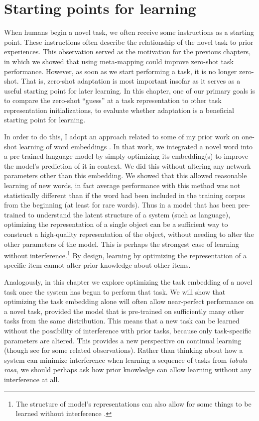 \section{Starting points for learning}

When humans begin a novel task, we often receive some instructions as a starting point. These instructions often describe the relationship of the novel task to prior experiences. This observation served as the motivation for the previous chapters, in which we showed that using meta-mapping could improve zero-shot task performance. However, as soon as we start performing a task, it is no longer zero-shot. That is, zero-shot adaptation is most important insofar as it serves as a useful starting point for later learning. In this chapter, one of our primary goals is to compare the zero-shot ``guess'' at a task representation to other task representation initializations, to evaluate whether adaptation is a beneficial starting point for learning. \par 
In order to do this, I adopt an approach related to some of my prior work on one-shot learning of word embeddings \citep{Lampinen2018a}. In that work, we integrated a novel word into a pre-trained language model by simply optimizing its embedding(s) to improve the model's prediction of it in context. We did this without altering any network parameters other than this embedding. We showed that this allowed reasonable learning of new words, in fact average performance with this method was not statistically different than if the word had been included in the training corpus from the beginning (at least for rare words). Thus in a model that has been pre-trained to understand the latent structure of a system (such as language), optimizing the representation of a single object can be a sufficient way to construct a high-quality representation of the object, without needing to alter the other parameters of the model. This is perhaps the strongest case of learning without interference.\footnote{The structure of model's representations can also allow for some things to be learned without interference \citep{McClelland2020}.} By design, learning by optimizing the representation of a specific item cannot alter prior knowledge about other items.\par
Analogously, in this chapter we explore optimizing the task embedding of a novel task once the system has begun to perform that task. We will show that optimizing the task embedding alone will often allow near-perfect performance on a novel task, provided the model that is pre-trained on sufficiently many other tasks from the same distribution. This means that a new task can be learned without the possibility of interference with prior tasks, because only task-specific parameters are altered. This provides a new perspective on continual learning (though see \citep{Oswald2020} for some related observations). Rather than thinking about how a system can minimize interference when learning a sequence of tasks from \emph{tabula rasa}, we should perhaps ask how prior knowledge can allow learning without any interference at all. \par 
